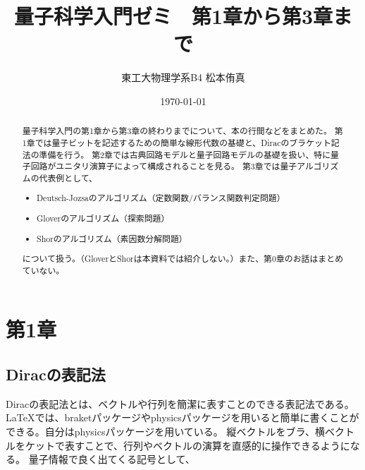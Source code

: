 \documentclass[a4paper,11pt,uplatex]{jsarticle}%
\title{量子科学入門ゼミ　第1章から第3章まで}
\author{東工大物理学系B4 松本侑真}
\date{\today}
\begin{document}
\maketitle
\begin{abstract}
  量子科学入門の第1章から第3章の終わりまでについて、本の行間などをまとめた。
  第1章では量子ビットを記述するための簡単な線形代数の基礎と、Diracのブラケット記法の準備を行う。
  第2章では古典回路モデルと量子回路モデルの基礎を扱い、特に量子回路がユニタリ演算子によって構成されることを見る。
  第3章では量子アルゴリズムの代表例として、
  \begin{itemize}
    \item Deutsch-Jozsaのアルゴリズム（定数関数/バランス関数判定問題）
    \item Gloverのアルゴリズム（探索問題）
    \item Shorのアルゴリズム（素因数分解問題）
  \end{itemize}
  について扱う。（GloverとShorは本資料では紹介しない。）また、第0章のお話はまとめていない。
\end{abstract}
\tableofcontents
\newpage

\section{第1章}

\subsection{Diracの表記法}
Diracの表記法とは、ベクトルや行列を簡潔に表すことのできる表記法である。
{\LaTeX}では、braketパッケージやphysicsパッケージを用いると簡単に書くことができる。自分はphysicsパッケージを用いている。
縦ベクトルをブラ、横ベクトルをケットで表すことで、行列やベクトルの演算を直感的に操作できるようになる。
量子情報で良く出てくる記号として、
\end{document}
